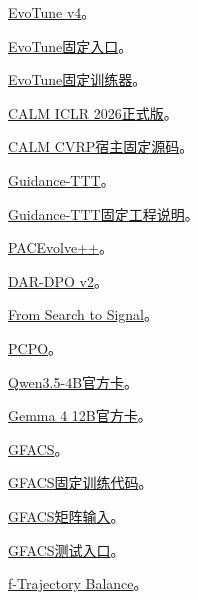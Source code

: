 \documentclass[11pt,a4paper]{article}
\newcommand{\referencetext}[1]{{\fontsize{9.4}{14.2}\selectfont#1\par}}
\begin{document}
\referencetext{[ER17] \href{https://arxiv.org/html/2504.05108v4}{EvoTune v4}。}
\referencetext{[ER18] \href{https://github.com/CLAIRE-Labo/EvoTune/blob/683b245251e96332892a52d2ad57e262f9d6e4c2/src/experiments/main.py}{EvoTune固定入口}。}
\referencetext{[ER19] \href{https://github.com/CLAIRE-Labo/EvoTune/blob/683b245251e96332892a52d2ad57e262f9d6e4c2/src/packing/train/train.py}{EvoTune固定训练器}。}
\referencetext{[ER20] \href{https://proceedings.iclr.cc/paper\_files/paper/2026/hash/75ed738c083f8941cfc990245e4f6265-Abstract-Conference.html}{CALM ICLR 2026正式版}。}
\referencetext{[ER21] \href{https://github.com/whxru/CALM/blob/3c40dbd78f2f6439bcc7cc2cbac334ab28a6f8f3/problems/cvrp\_aco.py}{CALM CVRP宿主固定源码}。}
\referencetext{[ER22] \href{https://arxiv.org/html/2610.06269v1}{Guidance-TTT}。}
\referencetext{[ER23] \href{https://github.com/Human-Agent-Society/reef/blob/ed8b415cf6eb1051902044428d6ac49c9ad0e3d9/recipes/tttd/examples/guidance\_ttt/README.md}{Guidance-TTT固定工程说明}。}
\referencetext{[ER24] \href{https://arxiv.org/html/2605.07039v1}{PACEvolve++}。}
\referencetext{[ER25] \href{https://arxiv.org/html/2507.10614v2}{DAR-DPO v2}。}
\referencetext{[ER26] \href{https://arxiv.org/html/2609.39383v1}{From Search to Signal}。}
\referencetext{[ER27] \href{https://arxiv.org/html/2609.38757v1}{PCPO}。}
\referencetext{[ER28] \href{https://huggingface.co/Qwen/Qwen3.5-4B}{Qwen3.5-4B官方卡}。}
\referencetext{[ER29] \href{https://huggingface.co/google/gemma-4-12B-it}{Gemma 4 12B官方卡}。}
\referencetext{[ER30] \href{https://proceedings.mlr.press/v258/kim25a.html}{GFACS}。}
\referencetext{[ER31] \href{https://github.com/ai4co/gfacs/blob/39d88cf2a5f9eb81eeea5a43ee57ff74ac8af01e/cvrp\_nls/train.py}{GFACS固定训练代码}。}
\referencetext{[ER32] \href{https://github.com/ai4co/gfacs/blob/39d88cf2a5f9eb81eeea5a43ee57ff74ac8af01e/cvrp\_nls/utils.py\#L57-L86}{GFACS矩阵输入}。}
\referencetext{[ER33] \href{https://github.com/ai4co/gfacs/blob/39d88cf2a5f9eb81eeea5a43ee57ff74ac8af01e/cvrp\_nls/test.py}{GFACS测试入口}。}
\referencetext{[ER34] \href{https://proceedings.mlr.press/v306/fawkes26a.html}{f-Trajectory Balance}。}
\end{document}
